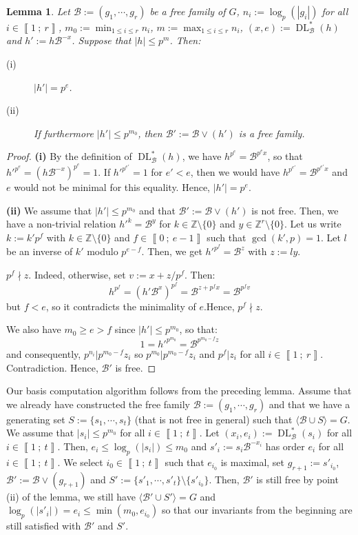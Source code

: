 \documentclass[a4paper,10pt]{report}
\theoremstyle{definition}
\theoremstyle{plain}
\newtheorem{lemma}[definition]{Lemma}
\theoremstyle{definition}
\newcommand{\Z}{\mathbb{Z}}
\newcommand{\m}[1]{\mathcal{#1}}
\renewcommand{\i}[2]{\left\llbracket #1~;~#2\right\rrbracket}
\renewcommand{\(}{\left(}
\renewcommand{\)}{\right)}
\DeclareMathOperator{\DL}{DL}
\begin{document}
\begin{lemma}
Let $\m{B}:=(g_1,\cdots, g_r)$ be a free family of $G$, $n_i:=\log_p(|g_i|)$ for all  $i\in\i{1}{r}$, $m_0:=\min_{1\leq i\leq r} n_i$, $m:=\max_{1\leq i\leq r} n_i$, $(x,e):=\DL_{\m{B}}^*(h)$ and $h':=h\m{B}^{-x}$. Suppose that $|h|\leq p^m$. Then:

\begin{description}
\item[(i)] $|h'|=p^e$.
\item[(ii)] If furthermore $|h'|\leq p^{m_0}$, then $\m{B}':=\m{B}\vee (h')$ is a free family.
\end{description}
\end{lemma}

\begin{proof}
\textbf{(i)} By the definition of $\DL_{\m{B}}^*(h)$, we have $h^{p^e}=\m{B}^{p^ex}$, so that ${h'}^{p^e}=(h\m{B}^{-x})^{p^e}=1$. If ${h'}^{p^{e'}}=1$ for $e'<e$, then we would have $h^{p^{e'}}=\m{B}^{p^{e'} x}$ and $e$ would not be minimal for this equality. Hence, $|h'|=p^e$.

\textbf{(ii)} We assume that $|h'|\leq p^{m_0}$ and that $\m{B}':=\m{B}\vee (h')$ is not free. Then, we have a non-trivial relation ${h'}^k=\m{B}^y$ for $k\in\Z\setminus\{0\}$ and $y\in\Z^r\setminus\{0\}$. Let us write $k:=k'p^f$ with $k\in\Z\setminus\{0\}$ and $f\in\i{0}{e-1}$ such that $\gcd(k',p)=1$. Let $l$ be an inverse of $k'$ modulo $p^{e-f}$. Then, we get $h'^{p^f}=\m{B}^{z}$ with $z:=ly$. 

$p^f\nmid z$. Indeed, otherwise, set $v:=x+z/p^f$. Then:
\[h^{p^f}=(h'\m{B}^x)^{p^f}=\m{B}^{z+p^fx}=\m{B}^{p^f v}\]
but $f<e$, so it contradicts the minimality of $e$.Hence, $p^f\nmid z$.

We also have $m_0\geq e>f$ since $|h'|\leq p^{m_0}$, so that: 
\[1={h'}^{p^{m_0}}=\m{B}^{p^{m_0-f}z}\]
and consequently, $p^{n_i}|p^{m_0-f}z_i$ so $p^{m_0}|p^{m_0-f}z_i$ and $p^f| z_i$ for all $i\in\i{1}{r}$. Contradiction. Hence, $\m{B}'$ is free.
\end{proof}

Our basis computation algorithm follows from the preceding lemma. Assume that we already have constructed the free family $\m{B}:=(g_1,\cdots, g_r)$ and that we have a generating set $S:=\{s_1,\cdots, s_t\}$ (that is not free in general) such that $\langle\m{B}\cup S\rangle=G$.  We assume that $|s_i|\leq p^{m_0}$ for all $i\in\i{1}{t}$. Let $(x_i,e_i):=\DL_{\m{B}}^*(s_i)$ for all $i\in\i{1}{t}$. Then, $e_i\leq \log_p(|s_i|)\leq m_0$ and $s'_i:=s_i\m{B}^{-x_i}$ has order $e_i$ for all $i\in\i{1}{t}$. We select $i_0\in\i{1}{t}$ such that $e_{i_0}$ is maximal, set $g_{r+1}:=s'_{i_0}$, $\m{B}':=\m{B}\vee(g_{r+1})$ and $S':=\{s'_1,\cdots, s'_t\}\setminus\{s'_{i_0}\}$. Then, $\m{B}'$ is still free by point (ii) of the lemma, we still have $\langle\m{B}'\cup S'\rangle=G$ and $\log_p(|s'_i|)=e_i\leq\min(m_0,e_{i_0})$ so that our invariants from the beginning are still satisfied with $\m{B}'$ and $S'$. 
\end{document}
